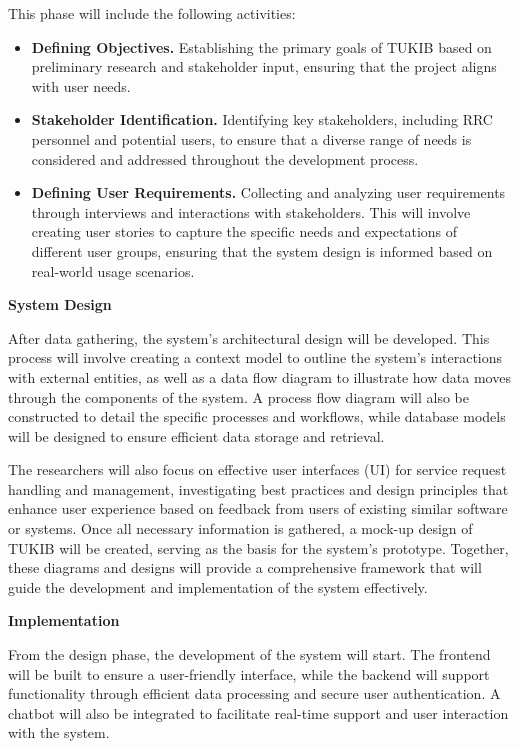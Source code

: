 This phase will include the following activities:

\begin{itemize}
	\item \textbf{Defining Objectives.} Establishing the primary goals of TUKIB based on preliminary research and stakeholder input, ensuring that the project aligns with user needs.
	\item \textbf{Stakeholder Identification.} Identifying key stakeholders, including RRC personnel and potential users, to ensure that a diverse range of needs is considered and addressed throughout the development process.
	\item \textbf{Defining User Requirements.} Collecting and analyzing user requirements through interviews and interactions with stakeholders. This will involve creating user stories to capture the specific needs and expectations of different user groups, ensuring that the system design is informed based on real-world usage scenarios.
\end{itemize}
	
\noindent\textbf{System Design}
	
After data gathering, the system's architectural design will be developed. This process will involve creating a context model to outline the system's interactions with external entities, as well as a data flow diagram to illustrate how data moves through the components of the system. A process flow diagram will also be constructed to detail the specific processes and workflows, while database models will be designed to ensure efficient data storage and retrieval. 

The researchers will also focus on effective user interfaces (UI) for service request handling and management, investigating best practices and design principles that enhance user experience based on feedback from users of existing similar software or systems. Once all necessary information is gathered, a mock-up design of TUKIB will be created, serving as the basis for the system's prototype. Together, these diagrams and designs will provide a comprehensive framework that will guide the development and implementation of the system effectively.\newline
	
\noindent\textbf{Implementation}
	
From the design phase, the development of the system will start. The frontend will be built to ensure a user-friendly interface, while the backend will support functionality through efficient data processing and secure user authentication. A chatbot will also be integrated to facilitate real-time support and user interaction with the system.

